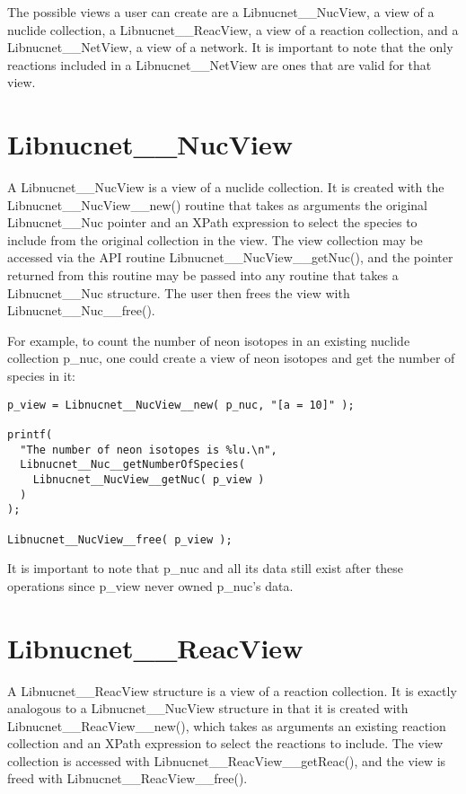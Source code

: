 \documentclass{article}    %
\begin{document}
The possible views a user can create are a Libnucnet\_\_NucView, a view
of a nuclide collection, a Libnucnet\_\_ReacView, a view of a reaction
collection, and a Libnucnet\_\_NetView, a view of a network.  It is important
to note that the only reactions included in a Libnucnet\_\_NetView are
ones that are valid for that view.

\section{Libnucnet\_\_NucView}

A Libnucnet\_\_NucView is a view of a nuclide collection.  It is created
with the Libnucnet\_\_NucView\_\_new() routine that takes as arguments
the original Libnucnet\_\_Nuc pointer and an XPath expression to select
the species to include from the original collection in the view.  The
view collection may be accessed via the API routine
Libnucnet\_\_NucView\_\_getNuc(), and the pointer returned from this
routine may be passed into any routine that takes a Libnucnet\_\_Nuc
structure.  The user then frees the view with
Libnucnet\_\_Nuc\_\_free().

For example, to count the number of neon isotopes in an existing nuclide
collection p\_nuc, one could create a view of neon isotopes and get the
number of species in it:
\begin{verbatim}
p_view = Libnucnet__NucView__new( p_nuc, "[a = 10]" );

printf(
  "The number of neon isotopes is %lu.\n",
  Libnucnet__Nuc__getNumberOfSpecies(
    Libnucnet__NucView__getNuc( p_view )
  )
);

Libnucnet__NucView__free( p_view );

\end{verbatim}
It is important to note that p\_nuc and all its data still exist after
these operations since p\_view never owned p\_nuc's data.

\section{Libnucnet\_\_ReacView}

A Libnucnet\_\_ReacView structure is a view of a reaction collection.
It is exactly analogous to a Libnucnet\_\_NucView structure in that it
is created with Libnucnet\_\_ReacView\_\_new(), which takes as arguments
an existing reaction collection and an XPath expression to select the
reactions to include.  The view collection is accessed with
Libnucnet\_\_ReacView\_\_getReac(), and the view is freed with
Libnucnet\_\_ReacView\_\_free().
\end{document}
